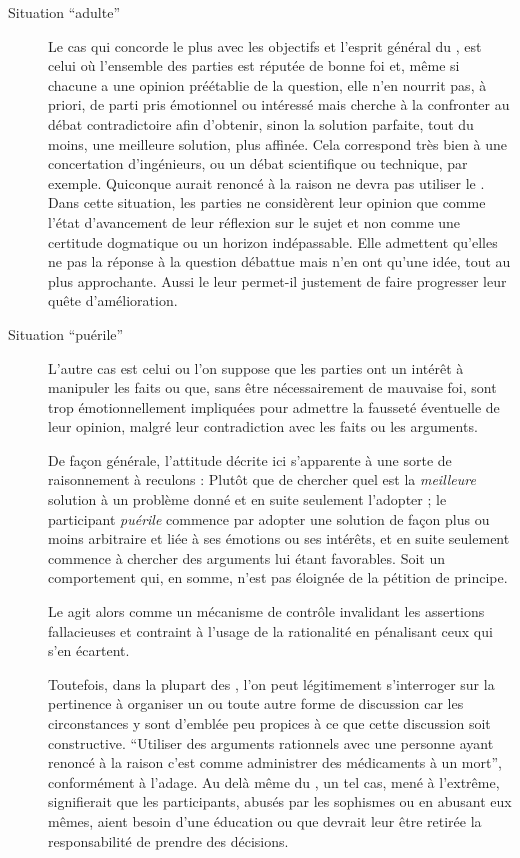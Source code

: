 \begin{description}
  \item[Situation \enquote{adulte}] Le cas qui concorde le plus avec les objectifs et l’esprit général du \mainabbr{}, est celui où l’ensemble des parties est réputée de bonne foi et, même si chacune a une opinion préétablie de la question, elle n’en nourrit pas, à priori, de parti pris émotionnel ou intéressé mais cherche à la confronter au débat contradictoire afin d’obtenir, sinon la solution parfaite, tout du moins, une meilleure solution, plus affinée. Cela correspond très bien à une concertation d’ingénieurs, ou un débat scientifique ou technique, par exemple. Quiconque aurait renoncé à la raison ne devra pas utiliser le \mainabbr{}.
Dans cette situation, les parties ne considèrent leur opinion que comme l’état d’avancement de leur réflexion sur le sujet et non comme une certitude dogmatique ou un horizon indépassable. Elle admettent qu’elles ne  pas la réponse à la question débattue mais n’en ont qu’une idée, tout au plus approchante. Aussi le \mainabbr{} leur permet-il justement de faire progresser leur quête d’amélioration.

  \item[Situation \enquote{puérile}] L’autre cas est celui ou l’on suppose que les parties ont un intérêt à manipuler les faits ou que, sans être nécessairement de mauvaise foi, sont trop émotionnellement impliquées pour admettre la fausseté éventuelle de leur opinion, malgré leur contradiction avec les faits ou les arguments.

  De façon générale, l’attitude décrite ici s’apparente à une sorte de raisonnement à reculons : Plutôt que de chercher quel est la \emph{meilleure} solution à un problème donné et en suite seulement l’adopter ; le participant \emph{puérile} commence par adopter une solution  de façon plus ou moins arbitraire et liée à ses émotions ou ses intérêts, et en suite seulement commence à chercher des arguments lui étant favorables. Soit un comportement qui, en somme, n’est pas éloignée de la pétition de principe.

  Le \mainabbr{} agit alors comme un mécanisme de contrôle invalidant les assertions fallacieuses et contraint à l’usage de la rationalité en pénalisant ceux qui s’en écartent.

  Toutefois, dans la plupart des , l’on peut légitimement s’interroger sur la pertinence à organiser un \mainabbr{} ou toute autre forme de discussion car les circonstances y sont d’emblée peu propices à ce que cette discussion soit constructive. \enquote{Utiliser des arguments rationnels avec une personne ayant renoncé à la raison c’est comme administrer des médicaments à un mort}\nocite{thomasPain1776AmercianCrisis}, conformément à l’adage. Au delà même du \mainabbr{}, un tel cas, mené à l’extrême, signifierait que les participants, abusés par les sophismes ou en abusant eux mêmes, aient besoin d’une éducation ou que devrait leur être retirée la responsabilité de prendre des décisions.
\end{description}



